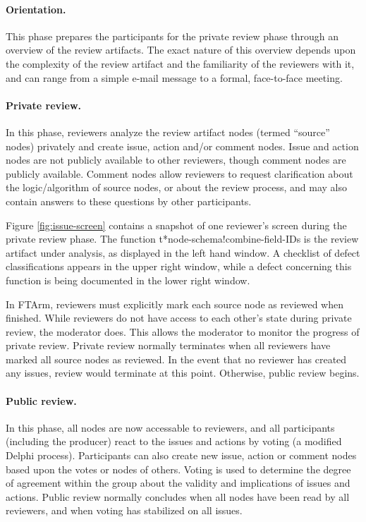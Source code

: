 \paragraph{Orientation.} This phase prepares the participants for the
private review phase through an overview of the review artifacts.  The
exact nature of this overview depends upon the complexity of the
review artifact and the familiarity of the reviewers with it, and can range
from a simple e-mail message to a formal, face-to-face meeting.

\paragraph {Private review.} In this phase, reviewers analyze the
review artifact nodes (termed ``source'' nodes) privately and create issue,
action and/or comment nodes.  Issue and action nodes are not publicly
available to other reviewers, though comment nodes are publicly available.
Comment nodes allow reviewers to request clarification about the
logic/algorithm of source nodes, or about the review process, and may also
contain answers to these questions by other participants.

Figure \ref{fig:issue-screen} contains a snapshot of one reviewer's
screen during the private review phase.  The function {\sf\small
t*node-schema!combine-field-IDs} is the review artifact under
analysis, as displayed in the left hand window.  A checklist of defect
classifications appears in the upper right window, while a defect
concerning this function is being documented in the lower right
window.

\begin{figure*} [t]
 {\centerline{}}
\caption{{\em A CSRS screen illustrating the generation of an issue.}}
\label{fig:issue-screen}
\end{figure*}

In FTArm, reviewers must explicitly mark each source node as reviewed
when finished. While reviewers do not have access to each other's
state during private review, the moderator does.  This allows the
moderator to monitor the progress of private review.  Private review
normally terminates when all reviewers have marked all source nodes as
reviewed. In the event that no reviewer has created any issues, review
would terminate at this point.  Otherwise, public
review begins.

\paragraph{Public review.} In this phase, all nodes are now
accessable to reviewers, and all participants (including the producer)
react to the issues and actions by voting (a modified Delphi process).
Participants can also create new issue, action or comment nodes based upon
the votes or nodes of others.  Voting is used to determine the degree of
agreement within the group about the validity and implications of issues
and actions.  Public review normally concludes when all nodes have been read
by all reviewers, and when voting has stabilized on all issues.

